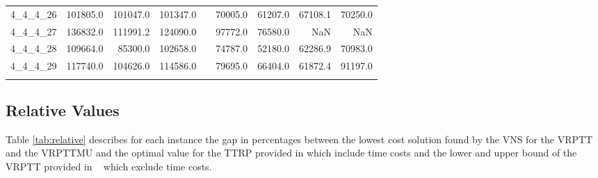 \begin{longtable}{lrrrcrrrr}
4\_4\_4\_26      &    101805.0 &      101047.0 &       101347.0 &&       70005.0 &         61207.0 &          67108.1 &          70250.0 \\
4\_4\_4\_27      &    136832.0 &      111991.2 &       124090.0 &&       97772.0 &         76580.0 &              NaN &              NaN \\
4\_4\_4\_28      &    109664.0 &       85300.0 &       102658.0 &&       74787.0 &         52180.0 &          62286.9 &          70983.0 \\
4\_4\_4\_29      &    117740.0 &      104626.0 &       114586.0 &&       79695.0 &         66404.0 &          61872.4 &          91197.0 \\
\bottomrule
\label{tab:nominal}
\end{longtable}

\newpage
\subsection{Relative Values}
\label{sec:gaps}

Table \ref{tab:relative} describes for each instance the gap in percentages  between the lowest cost solution  found by the VNS for  the VRPTT and the VRPTTMU and the optimal value for the TTRP provided in \cite{drexl2011branch} which include time costs  and the lower and upper bound of the VRPTT provided in ~\cite{drexl2014bandc} which exclude time costs.





